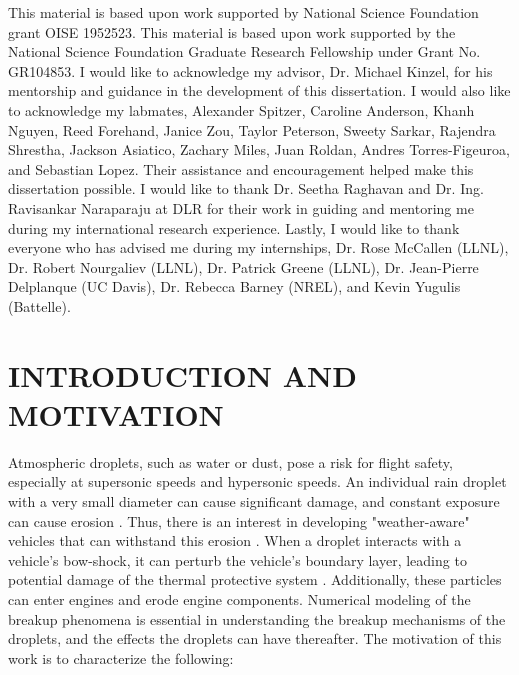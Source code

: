 \documentclass{UCF_ETD}
\begin{document}
\begin{acknowledgments}
    This material is based upon work supported by National Science Foundation grant OISE 1952523.
    This material is based upon work supported by the National Science Foundation Graduate Research Fellowship under Grant No. GR104853.
    I would like to acknowledge my advisor, Dr. Michael Kinzel, for his mentorship and guidance in the development of this dissertation.
    I would also like to acknowledge my labmates, Alexander Spitzer, Caroline Anderson, Khanh Nguyen, Reed Forehand, Janice Zou, Taylor Peterson, Sweety Sarkar, Rajendra Shrestha, Jackson Asiatico, Zachary Miles, Juan Roldan, Andres Torres-Figeuroa, and Sebastian Lopez. Their assistance and encouragement helped make this dissertation possible. 
    I would like to thank Dr. Seetha Raghavan and Dr. Ing. Ravisankar Naraparaju at DLR for their work in guiding and mentoring me during my international research experience.
    Lastly, I would like to thank everyone who has advised me during my internships, Dr. Rose McCallen (LLNL), Dr. Robert Nourgaliev (LLNL), Dr. Patrick Greene (LLNL), Dr. Jean-Pierre Delplanque (UC Davis), Dr. Rebecca Barney (NREL), and Kevin Yugulis (Battelle).
\end{acknowledgments}

\tableofcontents

\listoffigures

\listoftables

\newpage



\mainmatter

\chapter{INTRODUCTION AND MOTIVATION}
Atmospheric droplets, such as water or dust, pose a risk for flight safety, especially at supersonic speeds and hypersonic speeds. An individual rain droplet with a very small diameter can cause significant damage, and constant exposure can cause erosion \cite{LEtson1977}. Thus, there is an interest in developing "weather-aware" vehicles that can withstand this erosion \cite{MOYLAN2013223}. When a droplet interacts with a vehicle's bow-shock, it can perturb the vehicle's boundary layer, leading to potential damage of the thermal protective system \cite{Cook2021}. Additionally, these particles can enter engines and erode engine components. Numerical modeling of the breakup phenomena is essential in understanding the breakup mechanisms of the droplets, and the effects the droplets can have thereafter. The motivation of this work is to characterize the following:
\end{document}
